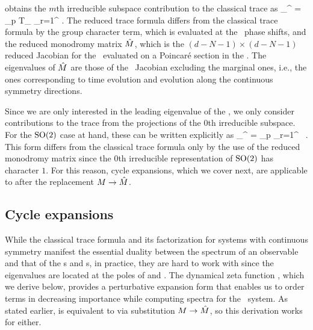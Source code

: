 obtains the $m$th irreducible subspace contribution to the classical trace as
\beq
\sum_{}^{\infty}  = \sum_p T_{\rpprime}
\sum_{r=1}^{\infty}  .
The reduced trace formula  differs from the
classical trace formula  by the group character
term, which is evaluated at the \rpo\ phase shifts, and the reduced monodromy
matrix $\hat{{M}}$, which is the $(d-N-1)\times(d-N-1)$ reduced Jacobian
for the \rpo\ evaluated on a Poincar\'e section in the \reducedsp . The eigenvalues
of $\hat{{M}}$ are those of the \rpo\ Jacobian 
excluding the marginal ones, i.e., the ones corresponding to time evolution and evolution
along the continuous symmetry directions.

Since we are only interested in the leading eigenvalue of the \evOper , we
only consider contributions to the
trace  from the projections
 of the $0$th irreducible subspace. For the $\textrm{SO}(2)$ case at hand, these can be written
explicitly as
\beq
\sum_{}^{\infty}  = \sum_p 
\sum_{r=1}^{\infty}  \, .
This form differs from the classical trace formula
 only by the use of the reduced monodromy matrix
 since
the $0$th irreducible representation of $\textrm{SO}(2)$ has character $1$. For this
reason, cycle expansions, which we cover next, are applicable
to  after the replacement
${M} \rightarrow \hat{{M}}$.

\subsection{Cycle expansions}
\label{s-CycExp}

While the classical trace formula  and its
factorization for systems with continuous symmetry  manifest
the essential duality between the spectrum of an observable and that of
the \po s and \rpo s, in practice, they are hard to work with since the
eigenvalues are located at the poles of  and
. The dynamical zeta function
, which we derive below, provides a perturbative expansion form that
enables us to order terms in decreasing importance while computing
spectra for the \twomode\ system. As stated earlier, 
is equivalent to  via substitution
${M} \rightarrow \hat{{M}}$, so this derivation works for either. 

